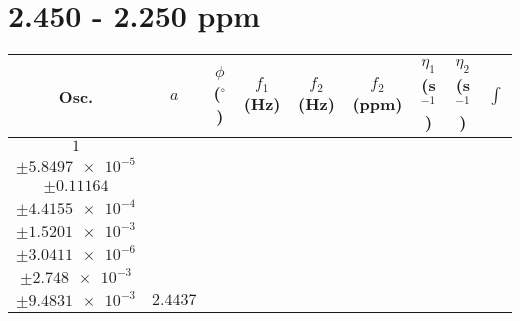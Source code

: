 \documentclass[8pt]{article}
\begin{document}
\section*{2.450 - 2.250 ppm}
\begin{longtable}[l]{c c c c c c c c c}
\toprule
Osc. & $a$ & $\phi$ ($^{\circ}$) & $f_1$ (Hz) & $f_2$ (Hz) & $f_2$ (ppm) & $\eta_1$ (s$^{-1}$) & $\eta_2$ (s$^{-1}$) & $\int$\\
\midrule
$\num{1}$ & \begin{tabular}[c]{@{}c@{}}$\num{3.0288e-2}$ \\ $\pm\num{5.8497e-5}$\end{tabular} & \begin{tabular}[c]{@{}c@{}}$\num{-0.88376}$ \\ $\pm\num{0.11164}$\end{tabular} & \begin{tabular}[c]{@{}c@{}}$\num{-11.395}$ \\ $\pm\num{4.4155e-4}$\end{tabular} & \begin{tabular}[c]{@{}c@{}}$\num{1.1683e+3}$ \\ $\pm\num{1.5201e-3}$\end{tabular} & \begin{tabular}[c]{@{}c@{}}$\num{2.3372}$ \\ $\pm\num{3.0411e-6}$\end{tabular} & \begin{tabular}[c]{@{}c@{}}$\num{1.1691}$ \\ $\pm\num{2.748e-3}$\end{tabular} & \begin{tabular}[c]{@{}c@{}}$\num{4.2276}$ \\ $\pm\num{9.4831e-3}$\end{tabular} & $\num{2.4437}$\\

\end{longtable}
\end{document}
